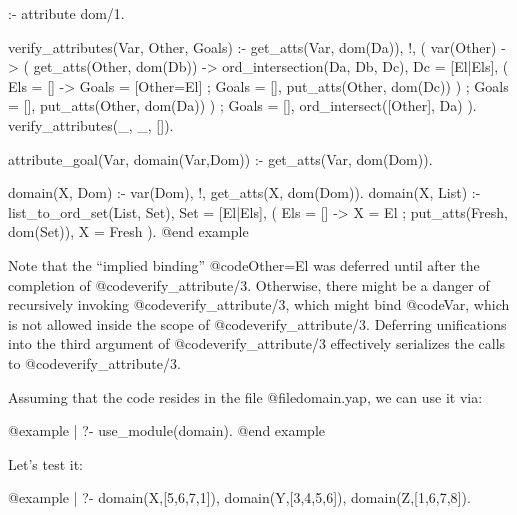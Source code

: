 {{{{{{{{:- attribute dom/1.

verify_attributes(Var, Other, Goals) :-
        get_atts(Var, dom(Da)), !,          %
        (   var(Other) ->                   %
            (   get_atts(Other, dom(Db)) -> %
                ord_intersection(Da, Db, Dc),
                Dc = [El|Els],              %
                (   Els = [] ->             %
                    Goals = [Other=El]      %
                ;   Goals = [],
                    put_atts(Other, dom(Dc))%
                )
            ;   Goals = [],
                put_atts(Other, dom(Da))    %
            )
        ;   Goals = [],
            ord_intersect([Other], Da)      %
        ).
verify_attributes(_, _, []).                %

attribute_goal(Var, domain(Var,Dom)) :-     %
        get_atts(Var, dom(Dom)).

domain(X, Dom) :-
        var(Dom), !,
        get_atts(X, dom(Dom)).
domain(X, List) :-
        list_to_ord_set(List, Set),
        Set = [El|Els],                     %
        (   Els = [] ->                     %
            X = El                          %
        ;   put_atts(Fresh, dom(Set)),
            X = Fresh                       %
        ).
@end example

Note that the ``implied binding'' @code{Other=El} was deferred until after
the completion of @code{verify_attribute/3}.  Otherwise, there might be a
danger of recursively invoking @code{verify_attribute/3}, which might bind
@code{Var}, which is not allowed inside the scope of @code{verify_attribute/3}.
Deferring unifications into the third argument of @code{verify_attribute/3}
effectively serializes the calls to @code{verify_attribute/3}.

Assuming that the code resides in the file @file{domain.yap}, we
can use it via:

@example
| ?- use_module(domain).
@end example

Let's test it:

@example
| ?- domain(X,[5,6,7,1]), domain(Y,[3,4,5,6]), domain(Z,[1,6,7,8]).

}}}}}}}}
